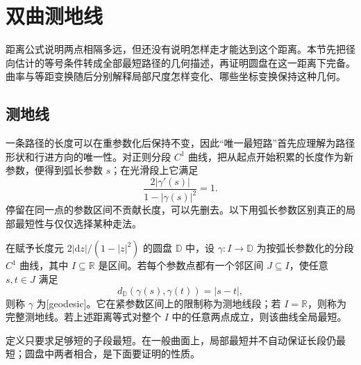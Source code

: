\section{双曲测地线}
\label{b3:sec:1302}

距离公式说明两点相隔多远，但还没有说明怎样走才能达到这个距离。本节先把径向估计的等号条件转成全部最短路径的几何描述，再证明圆盘在这一距离下完备。曲率与等距变换随后分别解释局部尺度怎样变化、哪些坐标变换保持这种几何。

\subsection{测地线}
\label{b3:subsec:130201}

一条路径的长度可以在重参数化后保持不变，因此“唯一最短路”首先应理解为路径形状和行进方向的唯一性。对正则分段 \(C^1\) 曲线，把从起点开始积累的长度作为新参数，便得到弧长参数 \(s\)；在光滑段上它满足
\[
 \frac{2|\gamma'(s)|}{1-|\gamma(s)|^2}=1.
\]
停留在同一点的参数区间不贡献长度，可以先删去。以下用弧长参数区别真正的局部最短性与仅仅选择某种走法。

\begin{definition}\label{b3:def:13-geodesic}
在赋予长度元 \(2|\mathrm dz|/(1-|z|^2)\) 的圆盘 \(\mathbb D\) 中，设 \(\gamma:I\to\mathbb D\) 为按弧长参数化的分段 \(C^1\) 曲线，其中 \(I\subseteq\mathbb R\) 是区间。若每个参数点都有一个邻区间 \(J\subseteq I\)，使任意 \(s,t\in J\) 满足
\[
 d_{\mathbb D}(\gamma(s),\gamma(t))=|s-t|,
\]
则称 \(\gamma\) 为[geodesic]。它在紧参数区间上的限制称为测地线段；若 \(I=\mathbb R\)，则称为完整测地线。若上述距离等式对整个 \(I\) 中的任意两点成立，则该曲线全局最短。
\end{definition}
定义只要求足够短的子段最短。在一般曲面上，局部最短并不自动保证长段仍最短；圆盘中两者相合，是下面要证明的性质。

